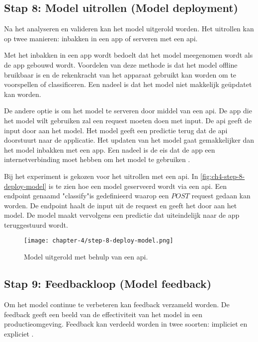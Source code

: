 \subsection{Stap 8: Model uitrollen (Model deployment)}\label{subsec:ch4-model-uitrollen}
Na het analyseren en valideren kan het model uitgerold worden. Het uitrollen kan op twee manieren: inbakken in een app of serveren met een \acrfull{api}.

Met het inbakken in een app wordt bedoelt dat het model meegenomen wordt als de app gebouwd wordt. Voordelen van deze methode is dat het model offline bruikbaar is en de rekenkracht van het apparaat gebruikt kan worden om te voorspellen of classificeren. Een nadeel is dat het model niet makkelijk geüpdatet kan worden.

De andere optie is om het model te serveren door middel van een \Acrshort{api}. De app die het model wilt gebruiken zal een request moeten doen met input. De \Acrshort{api} geeft de input door aan het model. Het model geeft een predictie terug dat de \Acrshort{api} doorstuurt naar de applicatie. Het updaten van het model gaat gemakkelijker dan het model inbakken met een app. Een nadeel is de eis dat de app een internetverbinding moet hebben om het model te gebruiken \cite[p.~130]{introduction-to-machine-learning}.

Bij het experiment is gekozen voor het uitrollen met een \acrshort{api}. In \autoref{fig:ch4-step-8-deploy-model} is te zien hoe een model geserveerd wordt via een \Acrshort{api}. Een endpoint genaamd "classify"\space is gedefinieerd waarop een \(POST\) request gedaan kan worden. De endpoint haalt de input uit de request en geeft het door aan het model. De model maakt vervolgens een predictie dat uiteindelijk naar de app teruggestuurd wordt.

\begin{figure}[hbt!]
  \centering
  \texttt{[image: chapter-4/step-8-deploy-model.png]}
  \caption{Model uitgerold met behulp van een \Acrshort{api}.}
  \label{fig:ch4-step-8-deploy-model}
\end{figure}

\newpage

\subsection{Stap 9: Feedbackloop (Model feedback)}\label{subsec:ch4-feebdack-loop}
Om het model continue te verbeteren kan feedback verzameld worden. De feedback geeft een beeld van de effectiviteit van het model in een productieomgeving. Feedback kan verdeeld worden in twee soorten: impliciet en expliciet \cite[p.~264]{introduction-to-machine-learning}.

